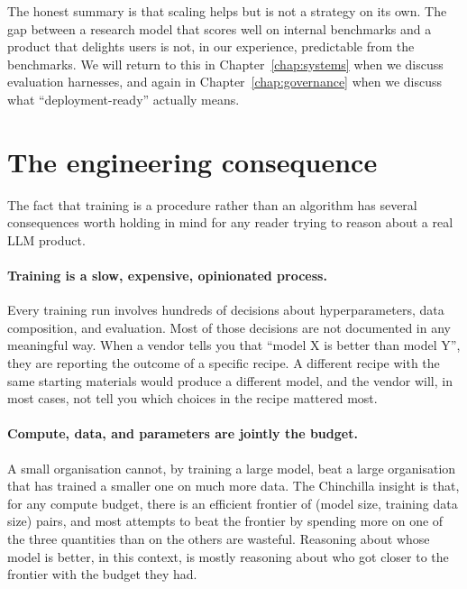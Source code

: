 The honest summary is that scaling helps but is not a strategy
on its own. The gap between a research model that scores well
on internal benchmarks and a product that delights users is not,
in our experience, predictable from the benchmarks. We will
return to this in Chapter~\ref{chap:systems} when we discuss evaluation
harnesses, and again in Chapter~\ref{chap:governance} when we discuss what
``deployment-ready'' actually means.

\section{The engineering consequence}

The fact that training is a procedure rather than an algorithm
has several consequences worth holding in mind for any reader
trying to reason about a real LLM product.

\paragraph{Training is a slow, expensive, opinionated process.}
Every training run involves hundreds of decisions about
hyperparameters, data composition, and evaluation. Most of those
decisions are not documented in any meaningful way. When a
vendor tells you that ``model X is better than model Y'', they
are reporting the outcome of a specific recipe. A different
recipe with the same starting materials would produce a
different model, and the vendor will, in most cases, not tell
you which choices in the recipe mattered most.

\paragraph{Compute, data, and parameters are jointly the budget.}
A small organisation cannot, by training a large model, beat a
large organisation that has trained a smaller one on much more
data. The Chinchilla insight is that, for any compute budget,
there is an efficient frontier of (model size, training data
size) pairs, and most attempts to beat the frontier by spending
more on one of the three quantities than on the others are
wasteful. Reasoning about whose model is better, in this
context, is mostly reasoning about who got closer to the
frontier with the budget they had.

